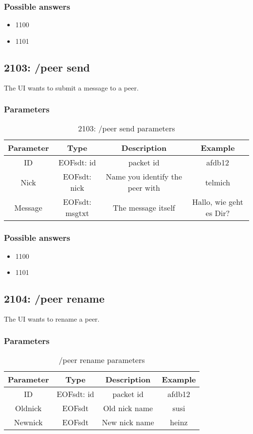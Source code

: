 \subsubsection{Possible answers}
\begin{itemize}
\item 1100
\item 1101
\end{itemize}
\subsection{2103: /peer send}
The UI wants to submit a message to a peer.

\subsubsection{Parameters}
%
\begin{longtable}{|c|c|c|c|}
\caption{2103: /peer send parameters}\\
\hline
\textbf{Parameter} & \textbf{Type} & \textbf{Description} & \textbf{Example}\\
\hline
ID & EOFsdt: id & packet id & afdb12\\
\hline
Nick & EOFsdt: nick & Name you identify the peer with & telmich\\
\hline
Message & EOFsdt: msgtxt & The message itself & Hallo, wie geht es Dir?\\
\hline
\end{longtable}

\subsubsection{Possible answers}
\begin{itemize}
\item 1100
\item 1101
\end{itemize}
\subsection{2104: /peer rename}
The UI wants to rename a peer.

\subsubsection{Parameters}
%
\begin{longtable}{|c|c|c|c|}
\caption{/peer rename parameters}\\
\hline
\textbf{Parameter} & \textbf{Type} & \textbf{Description} & \textbf{Example}\\
\hline
ID & EOFsdt: id & packet id & afdb12\\
\hline
Oldnick & EOFsdt & Old nick name & susi\\
\hline
Newnick & EOFsdt & New nick name & heinz\\
\hline
\end{longtable}

